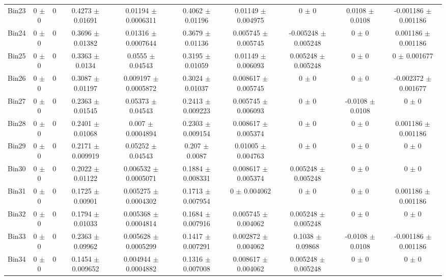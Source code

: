 \begin{tabular}{@{\extracolsep{4pt}}lccccccccc@{}}
     Bin23 & 0 $\pm$ 0 & 0 & 0.4273 $\pm$ 0.01691 & 0.01194 $\pm$ 0.0006311 & 0.4062 $\pm$ 0.01196 & 0.01149 $\pm$ 0.004975 & 0 $\pm$ 0 & 0.0108 $\pm$ 0.0108 & -0.001186 $\pm$ 0.001186 \\ 
     Bin24 & 0 $\pm$ 0 & 0 & 0.3696 $\pm$ 0.01382 & 0.01316 $\pm$ 0.0007644 & 0.3679 $\pm$ 0.01136 & 0.005745 $\pm$ 0.005745 & -0.005248 $\pm$ 0.005248 & 0 $\pm$ 0 & 0.001186 $\pm$ 0.001186 \\ 
     Bin25 & 0 $\pm$ 0 & 0 & 0.3363 $\pm$ 0.0134 & 0.0555 $\pm$ 0.04543 & 0.3195 $\pm$ 0.01059 & 0.01149 $\pm$ 0.006093 & 0.005248 $\pm$ 0.005248 & 0 $\pm$ 0 & 0 $\pm$ 0.001677 \\ 
     Bin26 & 0 $\pm$ 0 & 0 & 0.3087 $\pm$ 0.01197 & 0.009197 $\pm$ 0.0005872 & 0.3024 $\pm$ 0.01037 & 0.008617 $\pm$ 0.005745 & 0 $\pm$ 0 & 0 $\pm$ 0 & -0.002372 $\pm$ 0.001677 \\ 
     Bin27 & 0 $\pm$ 0 & 0 & 0.2363 $\pm$ 0.01545 & 0.05373 $\pm$ 0.04543 & 0.2413 $\pm$ 0.009223 & 0.005745 $\pm$ 0.006093 & 0 $\pm$ 0 & -0.0108 $\pm$ 0.0108 & 0 $\pm$ 0 \\ 
     Bin28 & 0 $\pm$ 0 & 0 & 0.2401 $\pm$ 0.01068 & 0.007 $\pm$ 0.0004894 & 0.2303 $\pm$ 0.009154 & 0.008617 $\pm$ 0.005374 & 0 $\pm$ 0 & 0 $\pm$ 0 & 0.001186 $\pm$ 0.001186 \\ 
     Bin29 & 0 $\pm$ 0 & 0 & 0.2171 $\pm$ 0.009919 & 0.05252 $\pm$ 0.04543 & 0.207 $\pm$ 0.0087 & 0.01005 $\pm$ 0.004763 & 0 $\pm$ 0 & 0 $\pm$ 0 & 0 $\pm$ 0 \\ 
     Bin30 & 0 $\pm$ 0 & 0 & 0.2022 $\pm$ 0.01122 & 0.006532 $\pm$ 0.0005071 & 0.1884 $\pm$ 0.008331 & 0.008617 $\pm$ 0.005374 & 0.005248 $\pm$ 0.005248 & 0 $\pm$ 0 & 0 $\pm$ 0 \\ 
     Bin31 & 0 $\pm$ 0 & 0 & 0.1725 $\pm$ 0.00901 & 0.005275 $\pm$ 0.0004302 & 0.1713 $\pm$ 0.007954 & 0 $\pm$ 0.004062 & 0 $\pm$ 0 & 0 $\pm$ 0 & 0.001186 $\pm$ 0.001186 \\ 
     Bin32 & 0 $\pm$ 0 & 0 & 0.1794 $\pm$ 0.01033 & 0.005368 $\pm$ 0.0004814 & 0.1684 $\pm$ 0.007916 & 0.005745 $\pm$ 0.004062 & 0.005248 $\pm$ 0.005248 & 0 $\pm$ 0 & 0 $\pm$ 0 \\ 
     Bin33 & 0 $\pm$ 0 & 0 & 0.2363 $\pm$ 0.09962 & 0.005628 $\pm$ 0.0005299 & 0.1417 $\pm$ 0.007291 & 0.002872 $\pm$ 0.004062 & 0.1038 $\pm$ 0.09868 & -0.0108 $\pm$ 0.0108 & -0.001186 $\pm$ 0.001186 \\ 
     Bin34 & 0 $\pm$ 0 & 0 & 0.1454 $\pm$ 0.009652 & 0.004944 $\pm$ 0.0004882 & 0.1316 $\pm$ 0.007008 & 0.008617 $\pm$ 0.004062 & 0.005248 $\pm$ 0.005248 & 0 $\pm$ 0 & 0 $\pm$ 0 \\ 

\end{tabular}
